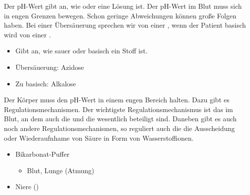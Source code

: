{%
Der pH-Wert gibt an, wie  oder  eine
Lösung ist. 
Der pH-Wert im Blut muss sich in engen Grenzen
bewegen. Schon geringe Abweichungen können große Folgen
haben. Bei einer Übersäuerung sprechen wir von einer
, wenn der Patient basisch wird
von einer .%
}{
\begin{itemize}
  \item Gibt an, wie sauer oder basisch ein Stoff ist.
  \item Übersäuerung: Azidose
  \item Zu basisch: Alkalose
\end{itemize}
}{}{}{}

{%
Der Körper muss den pH-Wert in einem engen Bereich halten.
Dazu gibt es Regulationsmechanismen. Der wichtigste
Regulationsmechanismus ist das
 im Blut, an
dem auch die  und die  wesentlich
beteiligt sind. Daneben gibt es auch noch andere
Regulationsmechanismen, so reguliert auch die  die
Ausscheidung oder Wiederaufnhame von Säure in Form
von Wasserstoffionen.
}{
\begin{itemize}
  \item Bikarbonat-Puffer\begin{itemize}
    \item Blut, Lunge (Atmung)
  \end{itemize}
  \item Niere ()
\end{itemize}
}{}{}{}

